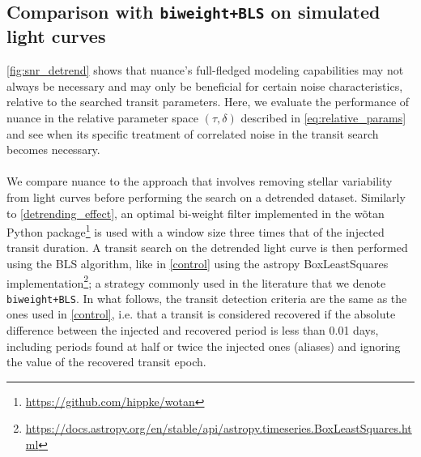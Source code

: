 \documentclass[modern]{aastex631}
\newcommand{\footlink}[1]{\footnote{\url{#1}}}
\begin{document}
\subsection{Comparison with \texttt{biweight+BLS} on simulated light curves}\label{simu}
\autoref{fig:snr_detrend} shows that \textsf{nuance}'s full-fledged modeling capabilities may not always be necessary and may only be beneficial for certain noise characteristics, relative to the searched transit parameters. Here, we evaluate the performance of \textsf{nuance} in the relative parameter space $(\tau, \delta)$ described in \autoref{eq:relative_params} and see when its specific treatment of correlated noise in the transit search becomes necessary.\\\\
We compare \textsf{nuance} to the approach that involves removing stellar variability from light curves before performing the search on a detrended dataset. Similarly to \autoref{detrending_effect}, an optimal bi-weight filter implemented in the \textsf{wõtan} Python package\footlink{https://github.com/hippke/wotan} is used with a window size three times that of the injected transit duration. A transit search on the detrended light curve is then performed using the BLS algorithm, like in \autoref{control} using the \textsf{astropy} \textsf{BoxLeastSquares} implementation\footlink{https://docs.astropy.org/en/stable/api/astropy.timeseries.BoxLeastSquares.html}; a strategy commonly used in the literature that we denote \texttt{biweight+BLS}. In what follows, the transit detection criteria are the same as the ones used in \autoref{control}, i.e. that a transit is considered recovered if the absolute difference between the injected and recovered period is less than 0.01 days, including periods found at half or twice the injected ones (aliases) and ignoring the value of the recovered transit epoch.
\end{document}
